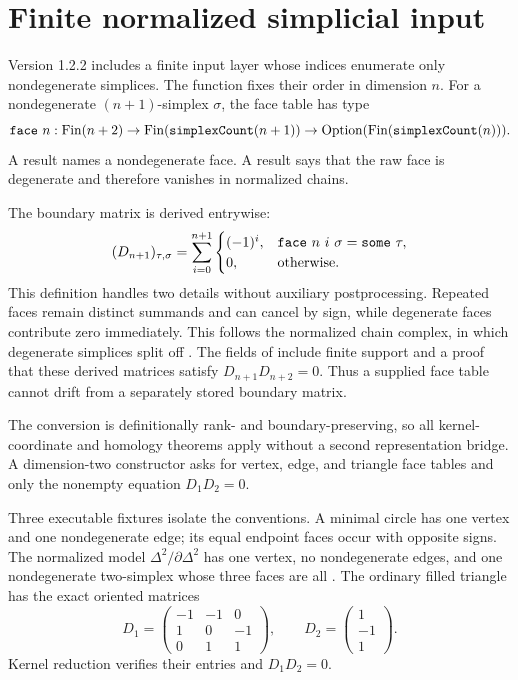\section{Finite normalized simplicial input}
\label{sec:normalized-input}

Version 1.2.2 includes a finite input layer whose indices enumerate only
nondegenerate simplices.  The function  fixes their
order in dimension $n$.  For a nondegenerate $(n+1)$-simplex $\sigma$, the
face table has type
\[
  \texttt{face}\ n :
  \operatorname{Fin}(n+2)\to
  \operatorname{Fin}(\texttt{simplexCount}(n+1))\to
  \operatorname{Option}
    (\operatorname{Fin}(\texttt{simplexCount}(n))).
\]
A result  names a nondegenerate face.  A result
 says that the raw face is degenerate and therefore vanishes in
normalized chains.

The boundary matrix is derived entrywise:
\[
  (D_{n+1})_{\tau,\sigma}
  =
  \sum_{i=0}^{n+1}
  \begin{cases}
    (-1)^i,&\texttt{face}\ n\ i\ \sigma=\texttt{some}\ \tau,\\
    0,&\text{otherwise}.
  \end{cases}
\]
This definition handles two details without auxiliary postprocessing.
Repeated faces remain distinct summands and can cancel by sign, while
degenerate faces contribute zero immediately.  This follows the normalized
chain complex, in which degenerate simplices split off
\citep[Definition 8.3.6 and Theorem 8.3.8]{weibel1994simplicial}.
The fields of
 include finite support and a proof
that these derived matrices satisfy $D_{n+1}D_{n+2}=0$.  Thus a supplied
face table cannot drift from a separately stored boundary matrix.

The conversion  is definitionally rank- and
boundary-preserving, so all kernel-coordinate and homology theorems apply
without a second representation bridge.  A dimension-two constructor asks
for vertex, edge, and triangle face tables and only the nonempty equation
$D_1D_2=0$.

Three executable fixtures isolate the conventions.  A minimal circle has one
vertex and one nondegenerate edge; its equal endpoint faces occur with
opposite signs.  The normalized model $\Delta^2/\partial\Delta^2$ has one
vertex, no nondegenerate edges, and one nondegenerate two-simplex whose three
faces are all .  The ordinary filled triangle has the exact
oriented matrices
\[
D_1=
\begin{pmatrix}
-1&-1&0\\
 1& 0&-1\\
 0& 1&1
\end{pmatrix},
\qquad
D_2=
\begin{pmatrix}1\\-1\\1\end{pmatrix}.
\]
Kernel reduction verifies their entries and $D_1D_2=0$.

